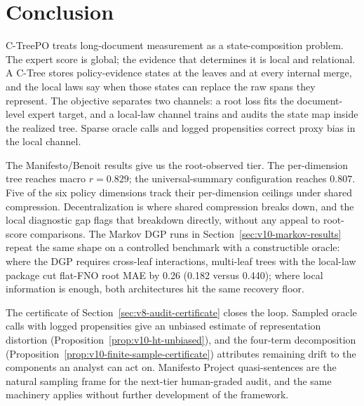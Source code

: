 \section{Conclusion}\label{sec:v8-conclusion}

C-TreePO treats long-document measurement as a state-composition
problem. The expert score is global; the evidence that determines it
is local and relational. A C-Tree stores policy-evidence states at
the leaves and at every internal merge, and the local laws say when
those states can replace the raw spans they represent. The objective
separates two channels: a root loss fits the document-level expert
target, and a local-law channel trains and audits the state map
inside the realized tree. Sparse oracle calls and logged
propensities correct proxy bias in the local channel.

The Manifesto/Benoit results give us the root-observed tier. The
per-dimension tree reaches macro \(r=0.829\); the universal-summary
configuration reaches \(0.807\). Five of the six policy dimensions
track their per-dimension ceilings under shared compression.
Decentralization is where shared compression breaks down, and the
local diagnostic gap flags that breakdown directly, without any
appeal to root-score comparisons. The Markov DGP runs in
Section~\ref{sec:v10-markov-results} repeat the same shape on a
controlled benchmark with a constructible oracle: where the DGP
requires cross-leaf interactions, multi-leaf trees with the
local-law package cut flat-FNO root MAE by 0.26 (0.182 versus
0.440); where local information is enough, both architectures hit
the same recovery floor.

The certificate of Section~\ref{sec:v8-audit-certificate} closes the
loop. Sampled oracle calls with logged propensities give an unbiased
estimate of representation distortion
(Proposition~\ref{prop:v10-ht-unbiased}), and the four-term
decomposition
(Proposition~\ref{prop:v10-finite-sample-certificate}) attributes
remaining drift to the components an analyst can act on.
Manifesto Project quasi-sentences are the natural sampling frame for
the next-tier human-graded audit, and the same machinery applies
without further development of the framework.
